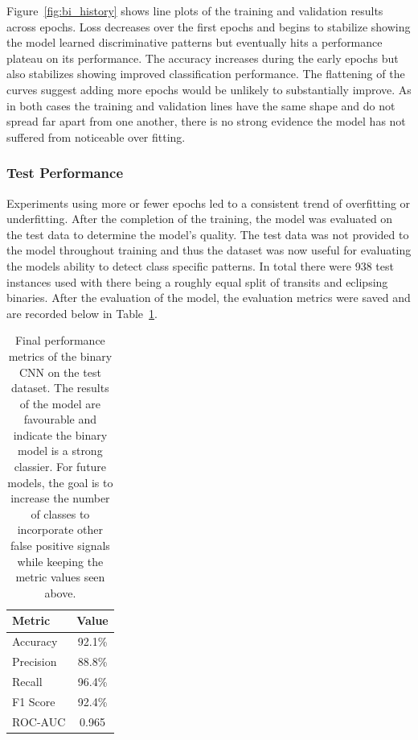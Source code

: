 Figure~\ref{fig:bi_history} shows line plots of the training and validation results across epochs. Loss decreases over the first epochs and begins to stabilize showing the model learned discriminative patterns but eventually hits a performance plateau on its performance. The accuracy increases during the early epochs but also stabilizes showing improved classification performance. The flattening of the curves suggest adding more epochs would be unlikely to substantially improve. As in both cases the training and validation lines have the same shape and do not spread far apart from one another, there is no strong evidence the model has not suffered from noticeable over fitting. 

\subsubsection{Test Performance}

Experiments using more or fewer epochs led to a consistent trend of overfitting or underfitting. After the completion of the training, the model was evaluated on the test data to determine the model's quality. The test data was not provided to the model throughout training and thus the dataset was now useful for evaluating the models ability to detect class specific patterns. In total there were 938 test instances used with there being a roughly equal split of transits and eclipsing binaries. After the evaluation of the model, the evaluation metrics were saved and are recorded below in Table~\ref{tab:metrics_table}. 

\begin{table}[H]
    \centering
    \begin{tabular}{lc}
        \hline
        \textbf{Metric} & \textbf{Value} \\
        \hline
        Accuracy  & 92.1\% \\
        Precision & 88.8\% \\
        Recall    & 96.4\% \\
        F1 Score  & 92.4\% \\
        ROC-AUC   & 0.965 \\
        \hline   
    \end{tabular}
    \caption{Final performance metrics of the binary CNN on the test dataset. The results of the model are favourable and indicate the binary model is a strong classier. For future models, the goal is to increase the number of classes to incorporate other false positive signals while keeping the metric values seen above. \label{tab:metrics_table}}
\end{table}

